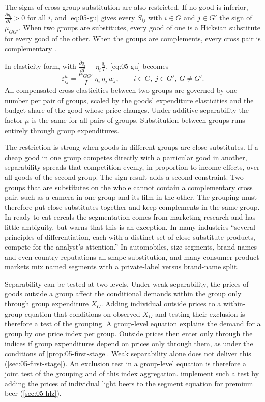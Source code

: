 The signs of cross-group substitution are also restricted. If no good is inferior, $\frac{\partial
q_i}{\partial I} > 0$ for all $i$, and \eqref{eq:05-gu} gives every $S_{ij}$ with $i \in G$ and $j \in G'$
the sign of $\mu_{GG'}$. When two groups are substitutes, every good of one is a Hicksian substitute for
every good of the other. When the groups are complements, every cross pair is complementary
\citep[p.~129]{DeatonMuellbauer1980b}.

In elasticity form, with $\frac{\partial q_i}{\partial I} = \eta_i\frac{q_i}{I}$, \eqref{eq:05-gu} becomes
\begin{equation}\label{eq:05-gu-elast}
  \varepsilon^h_{ij} = \frac{\mu_{GG'}}{I}\,\eta_i\,\eta_j\, w_j, \qquad i \in G,\ j \in G',\ G \neq G'.
\end{equation}
All compensated cross elasticities between two groups are governed by one number per pair of groups,
scaled by the goods' expenditure elasticities and the budget share of the good whose price changes. Under
additive separability the factor $\mu$ is the same for all pairs of groups. Substitution between groups
runs entirely through group expenditures.

The restriction is strong when goods in different groups are close substitutes. If a cheap good in one
group competes directly with a particular good in another, separability spreads that competition evenly,
in proportion to income effects, over all goods of the second group. The sign result adds a second
constraint. Two groups that are substitutes on the whole cannot contain a complementary cross pair, such
as a camera in one group and its film in the other. The grouping must therefore put close substitutes
together and keep complements in the same group. In ready-to-eat cereals the segmentation comes from marketing research and
has little ambiguity, but \citet[fn.~5]{Bresnahan1997} warns that this is an exception. In many
industries ``several principles of differentiation, each with a distinct set of close-substitute
products, compete for the analyst's attention.'' In automobiles, size segments, brand names and even
country reputations all shape substitution, and many consumer product markets mix named segments with a
private-label versus brand-name split.

Separability can be tested at two levels. Under weak separability, the prices of goods outside a group
affect the conditional demands within the group only through group expenditure $X_G$. Adding individual
outside prices to a within-group equation that conditions on observed $X_G$ and testing their exclusion
is therefore a test of the grouping. A group-level equation explains the demand for a group by one price
index per group. Outside prices then enter only through the indices if group expenditures depend on
prices only through them, as under the conditions of \cref{prop:05-first-stage}. Weak separability alone
does not deliver this (\cref{sec:05-first-stage}). An exclusion test in a group-level equation is
therefore a joint test of the grouping and of this index aggregation. \citet{HausmanLeonardZona1994}
implement such a test by adding the prices of individual light beers to the segment equation for premium
beer (\cref{sec:05-hlz}).

